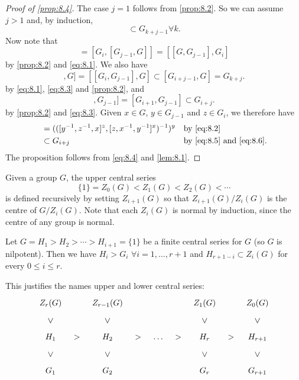 \documentclass{article}
\newcommand{\vge}{\rotatebox[origin=c]{-90}{$>$}}
\numberwithin{equation}{section}
\begin{document}
\begin{proof}[Proof of \cref{prop:8.4}]
  The case $j=1$ follows from \cref{prop:8.2}. So we can assume $j > 1$ and, by induction,
  \begin{equation}
    [G_k, G_{j-1}] \subset G_{k+j-1} \forall k. \label{eq:8.3}
  \end{equation}
  Now note that
  \begin{equation}
    [G_i, G_j] = [G_i, [G_{j-1},G]] = [[G,G_{j-1}],G_i]\label{eq:8.4}
  \end{equation}
  by \cref{prop:8.2} and \eqref{eq:8.1}. We also have
  \begin{equation}
    [[G_{j-1}, G_i], G] = [[G_i, G_{j-1}],G] \subset [G_{i+j-1},G] = G_{k+j}. \label{eq:8.5}
  \end{equation}
  by \eqref{eq:8.1}, \eqref{eq:8.3} and \cref{prop:8.2}, and
  \begin{equation}
    [[G_{i+1}, G], G_{j-1}] = [G_{i+1}, G_{j-1}] \subset G_{i+j}.\label{eq:8.6}
  \end{equation}
  by \cref{prop:8.2} and \eqref{eq:8.3}. Given $x \in G$, $y \in G_{j-1}$ and $z \in G_i$, we therefore have
  \begin{align*}
  [x,y,z] &= (([y^{-1}, z^{-1}, x]^z, [z,x^{-1},y^{-1}]^x)^{-1})^y & &\text{by }\eqref{eq:8.2} \\
          &\subset G_{i+j} &&\text{by } \eqref{eq:8.5}\text{ and }\eqref{eq:8.6}.
  \end{align*}
  The proposition follows from \eqref{eq:8.4} and \cref{lem:8.1}.
\end{proof}
\begin{defi}
  Given a group $G$, the upper central series
  \begin{equation*}
  \{1\} = Z_0(G) < Z_1(G) < Z_2(G) < \dotsb
  \end{equation*}
  is defined recursively by setting $Z_{i+1}(G)$ so that $Z_{i+1}(G)/Z_i(G)$ is the centre of $G/Z_i(G)$.
  Note that each $Z_i(G)$ is normal by induction, since the centre of any group is normal.
\end{defi}
\begin{nthm}\label{prop:8.5}
  Let $G = H_1 > H_2 > \dotsb > H_{i+1} = \{1\}$ be a finite central series for $G$ (so $G$ is nilpotent). Then we have $H_i > G_i$ $\forall i = 1, \dotsc, r+1$ and $H_{r+1-i} \subset Z_i(G)$ for every $0 \leq i \leq r$.
\end{nthm}
This justifies the names upper and lower central series:
\begin{equation*}
  \begin{tikzcd}[sep=tiny]
    Z_r(G) & & Z_{r-1}(G) &&&& Z_1(G) & & Z_0(G)\\
    \vge & & \vge  & & & & \vge && \vge\\
    H_1 & > & H_2 & > & \dots & > & H_r & > & H_{r+1}\\
    \vge & & \vge  & & & & \vge && \vge\\
    G_1 & & G_2 & & & & G_r & & G_{r+1}
  \end{tikzcd}
\end{equation*}
\end{document}
